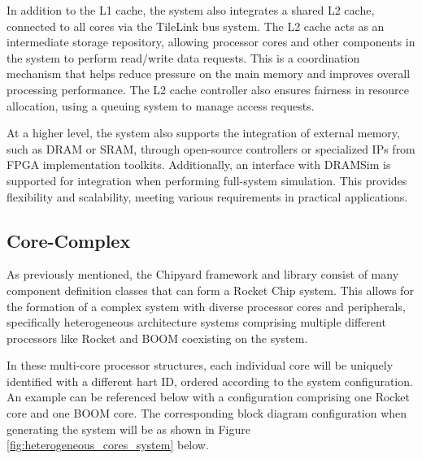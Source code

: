 In addition to the L1 cache, the system also integrates a shared L2 cache, connected to all cores via the TileLink bus system. The L2 cache acts as an intermediate storage repository, allowing processor cores and other components in the system to perform read/write data requests. This is a coordination mechanism that helps reduce pressure on the main memory and improves overall processing performance. The L2 cache controller also ensures fairness in resource allocation, using a queuing system to manage access requests.

At a higher level, the system also supports the integration of external memory, such as DRAM or SRAM, through open-source controllers or specialized IPs from FPGA implementation toolkits. Additionally, an interface with DRAMSim is supported for integration when performing full-system simulation. This provides flexibility and scalability, meeting various requirements in practical applications.

\subsection{Core-Complex}
\label{subsec:core_complex}

As previously mentioned, the Chipyard framework and library consist of many component definition classes that can form a Rocket Chip system. This allows for the formation of a complex system with diverse processor cores and peripherals, specifically heterogeneous architecture systems comprising multiple different processors like Rocket and BOOM coexisting on the system.

In these multi-core processor structures, each individual core will be uniquely identified with a different hart ID, ordered according to the system configuration. An example can be referenced below with a configuration comprising one Rocket core and one BOOM core. The corresponding block diagram configuration when generating the system will be as shown in Figure \ref{fig:heterogeneous_cores_system} below.


